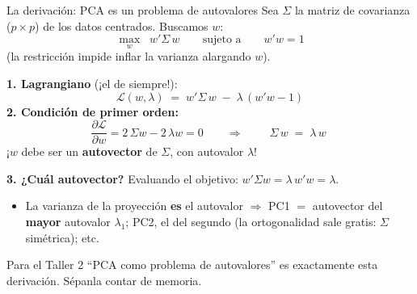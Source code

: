 \documentclass{beamer}
\newcommand{\1}{\mathbb{I}}
\begin{document}
\begin{frame}{La derivación: PCA es un problema de autovalores}
\small
Sea $\Sigma$ la matriz de covarianza ($p \times p$) de los datos centrados. Buscamos $w$:
\[ \max_{w} \;\; w' \Sigma\, w \qquad \text{sujeto a} \qquad w'w = 1 \]
(la restricción impide inflar la varianza alargando $w$).
\pause

\textbf{1. Lagrangiano} (¡el de siempre!):
\[ \mathcal{L}(w, \lambda) \;=\; w' \Sigma\, w \;-\; \lambda\,(w'w - 1) \]
\pause
\textbf{2. Condición de primer orden:}
\[ \frac{\partial \mathcal{L}}{\partial w} = 2\,\Sigma w - 2\,\lambda w = 0 \qquad \Longrightarrow \qquad \boxed{\; \Sigma\, w \;=\; \lambda\, w \;} \]
¡$w$ debe ser un \textbf{autovector} de $\Sigma$, con autovalor $\lambda$!
\pause

\textbf{3. ¿Cuál autovector?} Evaluando el objetivo: $w'\Sigma w = \lambda\, w'w = \lambda$.
\begin{itemize}\itemsep2pt
  \item La varianza de la proyección \textbf{es} el autovalor $\Rightarrow$ PC1 $=$ autovector del \textbf{mayor} autovalor $\lambda_1$; PC2, el del segundo (la ortogonalidad sale gratis: $\Sigma$ simétrica); etc.
\end{itemize}
\pause

\begin{block}{Para el Taller 2}
``PCA como problema de autovalores'' es exactamente esta derivación. Sépanla contar de memoria.
\end{block}
\end{frame}
\end{document}
